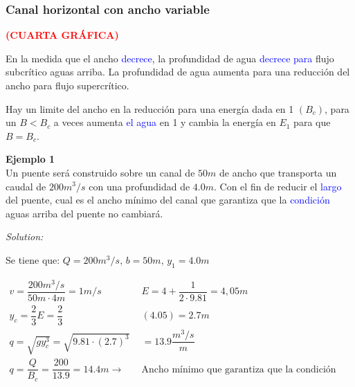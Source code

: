 \documentclass[a4paper, 11pt]{article}
\newenvironment{ejemplo}[2][Ejemplo]
    { \begin{mdframed}[backgroundcolor=gray!20] \textbf{#1 #2} \\}
    {  \end{mdframed}}
\newenvironment{solution}
    {\textit{Solution:}}
    {}
\begin{document}
\subsubsection{Canal horizontal con ancho variable}

\textcolor{red}{\textbf{(CUARTA GRÁFICA)}} \vspace{1ex}


En la medida que el ancho \textcolor{blue}{decrece}, la profundidad de agua \textcolor{blue}{decrece para}  flujo subcrítico aguas arriba. La profundidad de agua aumenta para una reducción del ancho para flujo supercrítico. \vspace{1ex}

Hay un limite del ancho en la reducción para una energía dada en 1 $(B_c)$, para un $B<B_{c}$ a veces aumenta \textcolor{blue}{el agua} en 1 y cambia la energía en $E_{1}$ para que $B=B_{c}$.


\begin{ejemplo}{1}

    Un puente será construido sobre un canal de $50m$ de ancho que transporta un caudal de $200m^{3}/s$ con una profundidad de $4.0m$. Con el fin de reducir el \textcolor{blue}{largo} del puente, cual es el ancho mínimo del canal que garantiza que la \textcolor{blue}{condición} aguas arriba del puente no cambiará. \vspace{2ex}

    \begin{solution} \vspace{1.5ex}

    Se tiene que: $Q=200m^{3}/s$, $b=50m$, $y_1=4.0m$

    \begin{equation}
        \begin{aligned}
            v=\dfrac{200 m^3/s}{50m \cdot 4m}=1m/s \qquad &E=4+\dfrac{1}{2\cdot9.81}=4,05m\\
            y_{c}=\dfrac{2}{3}E=\dfrac{2}{3}&(4.05)=2.7m\\
            q=\sqrt{gy^{3}_{c}}=\sqrt{9.81\cdot(2.7)^{3}}&=13.9 \dfrac{m^{3}/s}{m}\\
            q=\dfrac{Q}{B_c}=\dfrac{200}{13.9}=14.4m \rightarrow \quad &\text{Ancho mínimo que garantiza que la condición a.arriba no cambie}    
        \end{aligned} 
    \nonumber
    \end{equation}
    
    \end{solution}

\end{ejemplo}
\end{document}

